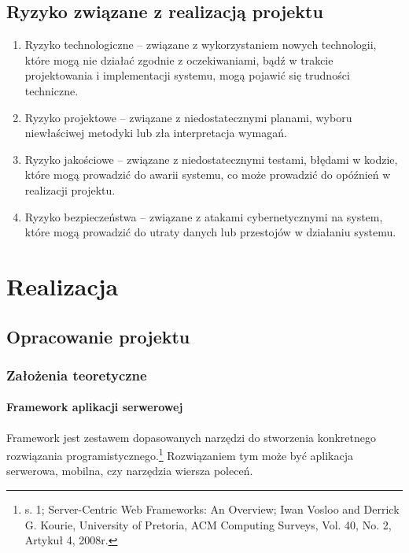 \documentclass[12pt, a4paper, twoside, openany]{book}
\newcommand{\forceindent}{\leavevmode{\parindent=1.3em\indent}}
\begin{document}
\section{Ryzyko związane z realizacją projektu}

\begin{enumerate}[label=--]
    \item Ryzyko technologiczne -- związane z wykorzystaniem nowych technologii, które mogą nie działać zgodnie z oczekiwaniami, bądź w trakcie projektowania i implementacji systemu, mogą pojawić się trudności techniczne.
    \item Ryzyko projektowe -- związane z niedostatecznymi planami, wyboru niewłaściwej metodyki lub zła interpretacja wymagań.
    \item Ryzyko jakościowe -- związane z niedostatecznymi testami, błędami w kodzie, które mogą prowadzić do awarii systemu, co może prowadzić do opóźnień w realizacji projektu.
    \item Ryzyko bezpieczeństwa -- związane z atakami cybernetycznymi na system, które mogą prowadzić do utraty danych lub przestojów w działaniu systemu.
\end{enumerate}

\chapter{Realizacja}

\section{Opracowanie projektu}


\subsection{Założenia teoretyczne}

\subsubsection{Framework aplikacji serwerowej}

\forceindent Framework jest zestawem dopasowanych narzędzi do stworzenia konkretnego rozwiązania programistycznego.\footnote{s. 1; Server-Centric Web Frameworks: An Overview; Iwan Vosloo and Derrick G. Kourie, University of Pretoria, ACM Computing Surveys, Vol. 40, No. 2, Artykuł 4, 2008r.}
Rozwiązaniem tym może być aplikacja serwerowa, mobilna, czy narzędzia wiersza poleceń.
\end{document}
